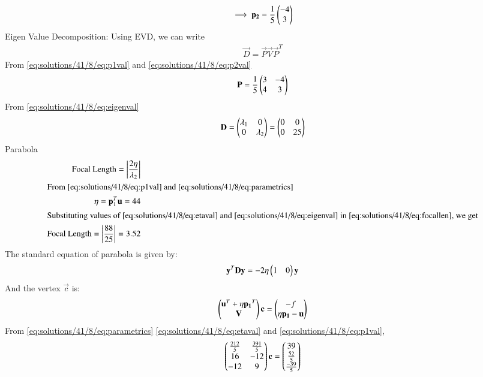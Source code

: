 \begin{align}
\implies \mathbf{p_2} = \frac{1}{5} \begin{pmatrix}-4\\ 3\end{pmatrix} \label{eq:solutions/41/8/eq:p2val}
\end{align}
{Eigen Value Decomposition:}
Using EVD, we can write 
\begin{align}
 \vec{D} = \vec{P} \vec{V} \vec{P}^T
\end{align}
From \eqref{eq:solutions/41/8/eq:p1val} and \eqref{eq:solutions/41/8/eq:p2val}
\begin{align}
 \mathbf{P} = \frac{1}{5} \begin{pmatrix}3 & -4 \\ 4 & 3\end{pmatrix}
\end{align}
From \eqref{eq:solutions/41/8/eq:eigenval}
\begin{align}
 \mathbf{D} = \begin{pmatrix}\lambda_1 & 0 \\ 0 & \lambda_2\end{pmatrix} = \begin{pmatrix}0 & 0 \\ 0 & 25\end{pmatrix}
\end{align}
{Parabola}
\begin{align}
\text{Focal Length} = \left\vert\frac{2\eta}{\lambda_2}\right\vert \label{eq:solutions/41/8/eq:focallen}\\
\intertext{From \eqref{eq:solutions/41/8/eq:p1val} and \eqref{eq:solutions/41/8/eq:parametrics}}
\eta = \mathbf{p}_1^T\mathbf{u} = 44 \label{eq:solutions/41/8/eq:etaval}\\
\intertext{Substituting values of \eqref{eq:solutions/41/8/eq:etaval} and \eqref{eq:solutions/41/8/eq:eigenval} in \eqref{eq:solutions/41/8/eq:focallen}, we get}
\text{Focal Length} = \left\vert\frac{88}{25}\right\vert=3.52
\end{align}
The standard equation of parabola is given by:
\begin{align}
 \mathbf{y}^T\mathbf{D}\mathbf{y} = -2\eta \begin{pmatrix}1 & 0\end{pmatrix}\mathbf{y} \label{eq:solutions/41/8/eq:parabola}
\end{align}
And the vertex $\vec{c}$ is:
\begin{align}
 \begin{pmatrix}\mathbf{u}^T+\eta \mathbf{p_1}^T \\ \mathbf{V}\end{pmatrix}\mathbf{c} = \begin{pmatrix}-f \\ \eta \mathbf{p_1}-\mathbf{u}\end{pmatrix}
\end{align}
From \eqref{eq:solutions/41/8/eq:parametrics} \eqref{eq:solutions/41/8/eq:etaval} and \eqref{eq:solutions/41/8/eq:p1val},
\begin{align}
\begin{pmatrix}\frac{212}{5} & \frac{391}{5} \\ 16 & -12 \\ -12 & 9\end{pmatrix}\mathbf{c}=\begin{pmatrix}39 \\ \frac{52}{5}\\ \frac{-39}{5}\end{pmatrix}
\end{align}
